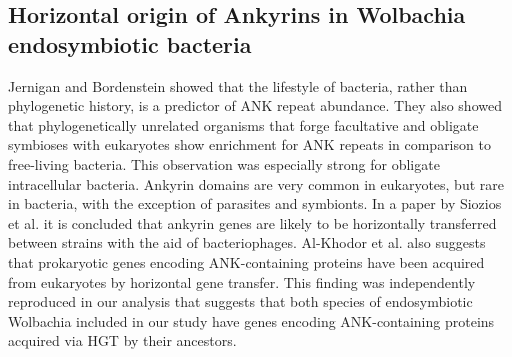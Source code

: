 \subsection{Horizontal origin of Ankyrins in Wolbachia endosymbiotic bacteria}
Jernigan and Bordenstein \cite{Jernigan2014} showed that the lifestyle of
bacteria, rather than phylogenetic history, is a predictor of ANK repeat
abundance. They also showed that phylogenetically unrelated organisms that
forge facultative and obligate symbioses with eukaryotes show enrichment for
ANK repeats in comparison to free-living bacteria. This observation was
especially strong for obligate intracellular bacteria. Ankyrin domains are very
common in eukaryotes, but rare in bacteria, with the exception of parasites and
symbionts. In a paper by Siozios et al. \cite{Siozios2013} it is concluded that
ankyrin genes are likely to be horizontally transferred between strains with
the aid of bacteriophages. Al-Khodor et al. \cite{Al-Khodor2010} also suggests
that prokaryotic genes encoding ANK-containing proteins have been acquired from
eukaryotes by horizontal gene transfer. This finding was independently
reproduced in our analysis that suggests that both species of endosymbiotic
Wolbachia included in our study have genes encoding ANK-containing proteins
acquired via HGT by their ancestors.
